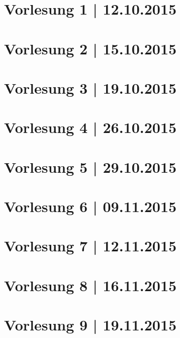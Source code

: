 


\maketitle
\thispagestyle{empty}

\newpage
\tableofcontents %
\clearpage

\newpage
\part*{Vorlesung 1 | 12.10.2015}

\newpage
\part*{Vorlesung 2 | 15.10.2015}


\newpage
\part*{Vorlesung 3 | 19.10.2015}


\newpage
\part*{Vorlesung 4 | 26.10.2015}

\newpage
\part*{Vorlesung 5 | 29.10.2015}

\newpage
\part*{Vorlesung 6 | 09.11.2015}

\newpage
\part*{Vorlesung 7 | 12.11.2015}

\newpage
\part*{Vorlesung 8 | 16.11.2015}

\newpage
\part*{Vorlesung 9 | 19.11.2015}













